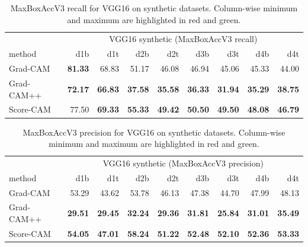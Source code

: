 \begin{table}[h]
\centering
\begin{tabular}{lrrrrrrrr}
\toprule
 & \multicolumn{8}{c}{VGG16 synthetic (MaxBoxAccV3 recall)} \\
method & d1b & d1t & d2b & d2t & d3b & d3t & d4b & d4t \\
\cmidrule(lr){1-1} \cmidrule(lr){2-9} 
Grad-CAM & \color{teal} \bfseries 81.33 & 68.83 & 51.17 & 46.08 & 46.94 & 45.06 & 45.33 & 44.00 \\
Grad-CAM++ & \color{purple} \bfseries 72.17 & \color{purple} \bfseries 66.83 & \color{purple} \bfseries 37.58 & \color{purple} \bfseries 35.58 & \color{purple} \bfseries 36.33 & \color{purple} \bfseries 31.94 & \color{purple} \bfseries 35.29 & \color{purple} \bfseries 38.75 \\
Score-CAM & 77.50 & \color{teal} \bfseries 69.33 & \color{teal} \bfseries 55.33 & \color{teal} \bfseries 49.42 & \color{teal} \bfseries 50.50 & \color{teal} \bfseries 49.50 & \color{teal} \bfseries 48.08 & \color{teal} \bfseries 46.79 \\
\bottomrule
\end{tabular}
\caption[MaxBoxAccV3 recall for VGG16 on synthetic datasets]{MaxBoxAccV3 recall for VGG16 on synthetic datasets. Column-wise minimum and maximum are highlighted in red and green.}
\label{tab:maxboxaccv3_recall_vgg16_base_synthetic}
\end{table}

\begin{table}[h]
\centering
\begin{tabular}{lrrrrrrrr}
\toprule
 & \multicolumn{8}{c}{VGG16 synthetic (MaxBoxAccV3 precision)} \\
method & d1b & d1t & d2b & d2t & d3b & d3t & d4b & d4t \\
\cmidrule(lr){1-1} \cmidrule(lr){2-9}
Grad-CAM & 53.29 & 43.62 & 53.78 & 46.13 & 47.38 & 44.70 & 47.99 & 48.13 \\
Grad-CAM++ & \color{purple} \bfseries 29.51 & \color{purple} \bfseries 29.45 & \color{purple} \bfseries 32.24 & \color{purple} \bfseries 29.36 & \color{purple} \bfseries 31.81 & \color{purple} \bfseries 25.84 & \color{purple} \bfseries 31.01 & \color{purple} \bfseries 35.49 \\
Score-CAM & \color{teal} \bfseries 54.05 & \color{teal} \bfseries 47.01 & \color{teal} \bfseries 58.24 & \color{teal} \bfseries 51.22 & \color{teal} \bfseries 52.48 & \color{teal} \bfseries 52.10 & \color{teal} \bfseries 52.36 & \color{teal} \bfseries 53.33 \\
\bottomrule
\end{tabular}
\caption[MaxBoxAccV3 precision for VGG16 on synthetic datasets]{MaxBoxAccV3 precision for VGG16 on synthetic datasets. Column-wise minimum and maximum are highlighted in red and green.}
\label{tab:maxboxaccv3_precision_vgg16_base_synthetic}
\end{table}

